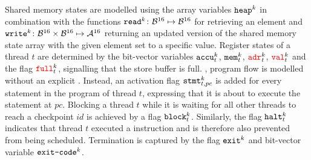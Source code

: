 Shared memory states are modelled using the array variables $\texttt{heap}^k$ in combination with the functions $\texttt{read}^k \colon \mathcal{B}^{16} \mapsto \mathcal{B}^{16}$ for retrieving an element and $\texttt{write}^k \colon \mathcal{B}^{16} \times \mathcal{B}^{16} \mapsto \mathcal{A}^{16}$ returning an updated version of the shared memory state array with the given element set to a specific value.
Register states of a thread $t$ are determined by the bit-vector variables $\texttt{accu}^k_t$, $\texttt{mem}^k_t$, ${\color{red}\texttt{adr}}^k_t$, ${\color{red}\texttt{val}}^k_t$ and the flag ${\color{red}\texttt{full}}^k_t$, signalling that the store buffer is full.
, program flow is modelled without an explicit .
Instead, an activation flag $\texttt{stmt}^k_{t, pc}$ is added for every statement in the program of thread $t$, expressing that it is about to execute the statement at $pc$.
Blocking a thread $t$ while it is waiting for all other threads to reach a checkpoint $id$ is achieved by a flag $\texttt{block}^k_t$.
Similarly, the flag $\texttt{halt}^k_t$ indicates that thread $t$ executed a  instruction and is therefore also prevented from being scheduled.
Termination is captured by the flag $\texttt{exit}^k$ and bit-vector variable $\texttt{exit-code}^k$.

